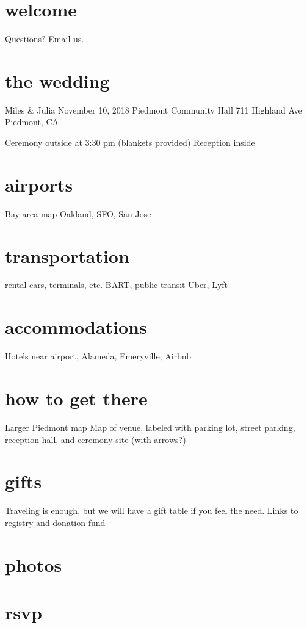 \documentclass{article}
\begin{document}
\section{welcome}

Questions? Email us.

\section{the wedding}
Miles \& Julia
November 10, 2018
Piedmont Community Hall
711 Highland Ave
Piedmont, CA

Ceremony outside at 3:30 pm (blankets provided)
Reception inside

\section{airports}
Bay area map
Oakland, SFO, San Jose

\section{transportation}
rental cars, terminals, etc.
BART, public transit
Uber, Lyft

\section{accommodations}
Hotels near airport, Alameda, Emeryville, Airbnb

\section{how to get there}
Larger Piedmont map
Map of venue, labeled with parking lot, street parking, reception hall, and ceremony site (with arrows?)

\section{gifts}
Traveling is enough, but we will have a gift table if you feel the need.
Links to registry and donation fund

\section{photos}

\section{rsvp}
\end{document}
